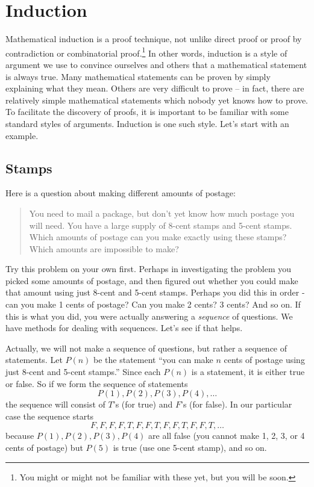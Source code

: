 \documentclass[12pt]{article}
\begin{document}
\section{Induction}

Mathematical induction is a proof technique, not unlike direct proof or proof by contradiction or combinatorial proof.\footnote{You might or might not be familiar with these yet, but you will be soon.}  In other words, induction is a style of argument we use to convince ourselves and others that a mathematical statement is always true.  Many mathematical statements can be proven by simply explaining what they mean.  Others are very difficult to prove -- in fact, there are relatively simple mathematical statements which nobody yet knows how to prove.  To facilitate the discovery of proofs, it is important to be familiar with some standard styles of arguments.  Induction is one such style.  Let's start with an example.

\subsection{Stamps}

Here is a question about making different amounts of postage:

\begin{quote}
  You need to mail a package, but don't yet know how much postage you will need. You have
a large supply of 8-cent stamps and 5-cent stamps. Which amounts of postage can you make
exactly using these stamps? Which amounts are impossible to make?
\end{quote}

Try this problem on your own first.  Perhaps in investigating the problem you picked some amounts of postage, and then figured out whether you could make that amount using just 8-cent and 5-cent stamps.  Perhaps you did this in order - can you make 1 cents of postage?  Can you make 2 cents?  3 cents? And so on.  If this is what you did, you were actually answering a {\em sequence} of questions.  We have methods for dealing with sequences.  Let's see if that helps.

Actually, we will not make a sequence of questions, but rather a sequence of statements.  Let $P(n)$ be the statement ``you can make $n$ cents of postage using just 8-cent and 5-cent stamps.''  Since each $P(n)$ is a statement, it is either true or false.  So if we form the sequence of statements
\[P(1), P(2), P(3), P(4), \ldots\]
the sequence will consist of $T$'s (for true) and $F$'s (for false).  In our particular case the sequence starts
\[F,F,F,F,T,F,F,T,F,F,T,F,F,T,\ldots\]
because $P(1), P(2), P(3), P(4)$ are all false (you cannot make 1, 2, 3, or 4 cents of postage) but $P(5)$ is true (use one 5-cent stamp), and so on.  
\end{document}
